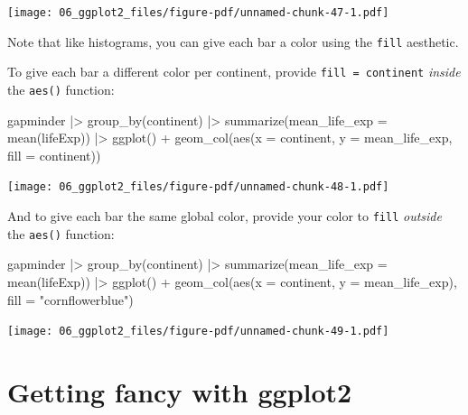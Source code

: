 \documentclass[
  letterpaper,
  DIV=11,
  numbers=noendperiod]{scrreprt}
\newenvironment{Shaded}{\begin{snugshade}}{\end{snugshade}}
\newcommand{\AttributeTok}[1]{\textcolor[rgb]{0.40,0.45,0.13}{#1}}
\newcommand{\FunctionTok}[1]{\textcolor[rgb]{0.28,0.35,0.67}{#1}}
\newcommand{\NormalTok}[1]{\textcolor[rgb]{0.00,0.23,0.31}{#1}}
\newcommand{\SpecialCharTok}[1]{\textcolor[rgb]{0.37,0.37,0.37}{#1}}
\newcommand{\StringTok}[1]{\textcolor[rgb]{0.13,0.47,0.30}{#1}}
\begin{document}
\texttt{[image: 06\_ggplot2\_files/figure-pdf/unnamed-chunk-47-1.pdf]}

Note that like histograms, you can give each bar a color using the
\texttt{fill} aesthetic.

To give each bar a different color per continent, provide
\texttt{fill\ =\ continent} \emph{inside} the \texttt{aes()} function:

\begin{Shaded}
\begin{Highlighting}[]
\NormalTok{gapminder }\SpecialCharTok{|\textgreater{}}
  \FunctionTok{group\_by}\NormalTok{(continent) }\SpecialCharTok{|\textgreater{}}
  \FunctionTok{summarize}\NormalTok{(}\AttributeTok{mean\_life\_exp =} \FunctionTok{mean}\NormalTok{(lifeExp)) }\SpecialCharTok{|\textgreater{}}
  \FunctionTok{ggplot}\NormalTok{() }\SpecialCharTok{+}
  \FunctionTok{geom\_col}\NormalTok{(}\FunctionTok{aes}\NormalTok{(}\AttributeTok{x =}\NormalTok{ continent, }\AttributeTok{y =}\NormalTok{ mean\_life\_exp, }\AttributeTok{fill =}\NormalTok{ continent))}
\end{Highlighting}
\end{Shaded}

\texttt{[image: 06\_ggplot2\_files/figure-pdf/unnamed-chunk-48-1.pdf]}

And to give each bar the same global color, provide your color to
\texttt{fill} \emph{outside} the \texttt{aes()} function:

\begin{Shaded}
\begin{Highlighting}[]
\NormalTok{gapminder }\SpecialCharTok{|\textgreater{}}
  \FunctionTok{group\_by}\NormalTok{(continent) }\SpecialCharTok{|\textgreater{}}
  \FunctionTok{summarize}\NormalTok{(}\AttributeTok{mean\_life\_exp =} \FunctionTok{mean}\NormalTok{(lifeExp)) }\SpecialCharTok{|\textgreater{}}
  \FunctionTok{ggplot}\NormalTok{() }\SpecialCharTok{+}
  \FunctionTok{geom\_col}\NormalTok{(}\FunctionTok{aes}\NormalTok{(}\AttributeTok{x =}\NormalTok{ continent, }\AttributeTok{y =}\NormalTok{ mean\_life\_exp),}
           \AttributeTok{fill =} \StringTok{"cornflowerblue"}\NormalTok{)}
\end{Highlighting}
\end{Shaded}

\texttt{[image: 06\_ggplot2\_files/figure-pdf/unnamed-chunk-49-1.pdf]}

\section{Getting fancy with ggplot2}\label{getting-fancy-with-ggplot2}
\end{document}
